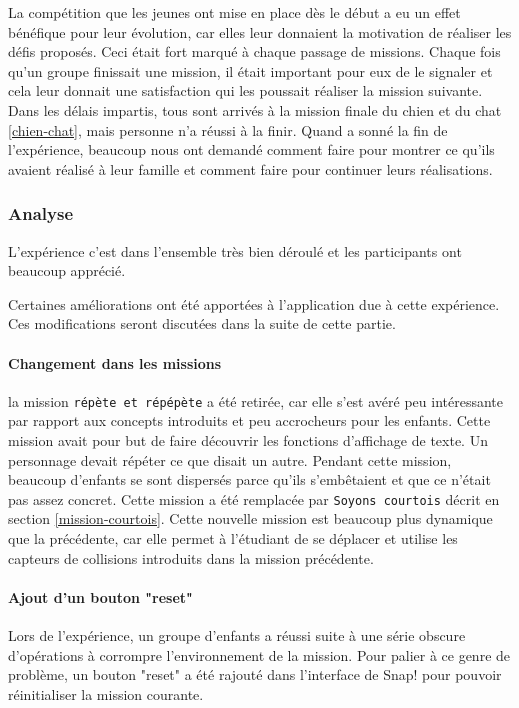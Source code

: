 La compétition que les jeunes ont mise en place dès le début a eu un effet bénéfique pour leur évolution, car elles leur donnaient la motivation de réaliser les défis proposés. Ceci était fort marqué à chaque passage de missions. Chaque fois qu'un groupe finissait une mission, il était important pour eux de le signaler et cela leur donnait une satisfaction qui les poussait réaliser la mission suivante.\\ %

Dans les délais impartis, tous sont arrivés à la mission finale du chien et du chat \ref{chien-chat}, mais personne n'a réussi à la finir. Quand a sonné la fin de l'expérience, beaucoup nous ont demandé comment faire pour montrer ce qu'ils avaient réalisé à leur famille et comment faire pour continuer leurs réalisations.

\subsubsection{Analyse}
\label{analyse-kidscode}
L'expérience c'est dans l'ensemble très bien déroulé et les participants ont beaucoup apprécié.

Certaines améliorations ont été apportées à l'application due à cette expérience. Ces modifications seront discutées dans la suite de cette partie.

\paragraph{Changement dans les missions}
la mission \texttt{répète et répépète} a été retirée, car elle s'est avéré peu intéressante par rapport aux concepts introduits et peu accrocheurs pour les enfants. Cette mission avait pour but de faire découvrir les fonctions d'affichage de texte. Un personnage devait répéter ce que disait un autre. Pendant cette mission, beaucoup d'enfants se sont dispersés parce qu'ils s'embêtaient et que ce n'était pas assez concret. Cette mission a été remplacée par \texttt{Soyons courtois} décrit en section \ref{mission-courtois}. Cette nouvelle mission est beaucoup plus dynamique que la précédente, car elle permet à l'étudiant de se déplacer et utilise les capteurs de collisions introduits dans la mission précédente.

\paragraph{Ajout d'un bouton "reset"}
Lors de l'expérience, un groupe d'enfants a réussi suite à une série obscure d'opérations à corrompre l'environnement de la mission. Pour palier à ce genre de problème, un bouton "reset" a été rajouté dans l'interface de Snap! pour pouvoir réinitialiser la mission courante.

